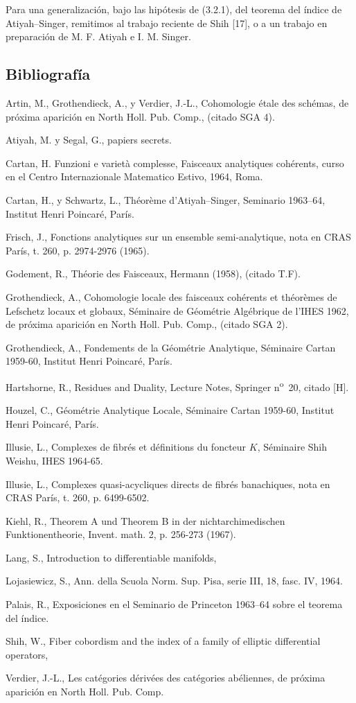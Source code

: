 Para una generalización, bajo las hipótesis de (3.2.1), del teorema del índice de Atiyah--Singer, remitimos al trabajo reciente de Shih [17], o a un trabajo en preparación de M. F. Atiyah e I. M. Singer.

\subsection*{Bibliografía}
\begin{enumerate}[label={[\arabic*]}]
\item Artin, M., Grothendieck, A., y Verdier, J.-L., Cohomologie étale des schémas, de próxima aparición en North Holl. Pub. Comp., (citado SGA 4).
\item Atiyah, M. y Segal, G., papiers secrets.
\item Cartan, H. Funzioni e varietà complesse, Faisceaux analytiques cohérents, curso en el Centro Internazionale Matematico Estivo, 1964, Roma.
\item Cartan, H., y Schwartz, L., Théorème d'Atiyah--Singer, Seminario 1963--64, Institut Henri Poincaré, París.
\item Frisch, J., Fonctions analytiques sur un ensemble semi-analytique, nota en CRAS París, t. 260, p. 2974-2976 (1965).
\item Godement, R., Théorie des Faisceaux, Hermann (1958), (citado T.F).
\item Grothendieck, A., Cohomologie locale des faisceaux cohérents et théorèmes de Lefschetz locaux et globaux, Séminaire de Géométrie Algébrique de l'IHES 1962, de próxima aparición en North Holl. Pub. Comp., (citado SGA 2).
\item Grothendieck, A., Fondements de la Géométrie Analytique, Séminaire Cartan 1959-60, Institut Henri Poincaré, París.
\item Hartshorne, R., Residues and Duality, Lecture Notes, Springer n\textsuperscript{o}~20, citado [H].
\item Houzel, C., Géométrie Analytique Locale, Séminaire Cartan 1959-60, Institut Henri Poincaré, París.
\item Illusie, L., Complexes de fibrés et définitions du foncteur $K$, Séminaire Shih Weishu, IHES 1964-65.
\item Illusie, L., Complexes quasi-acycliques directs de fibrés banachiques, nota en CRAS París, t. 260, p. 6499-6502.
\item Kiehl, R., Theorem A und Theorem B in der nichtarchimedischen Funktionentheorie, Invent. math. 2, p. 256-273 (1967).
\item Lang, S., Introduction to differentiable manifolds,
\item Lojasiewicz, S., Ann. della Scuola Norm. Sup. Pisa, serie III, 18, fasc. IV, 1964.
\item Palais, R., Exposiciones en el Seminario de Princeton 1963--64 sobre el teorema del índice.
\item Shih, W., Fiber cobordism and the index of a family of elliptic differential operators,
\item Verdier, J.-L., Les catégories dérivées des catégories abéliennes, de próxima aparición en North Holl. Pub. Comp.
\end{enumerate}
